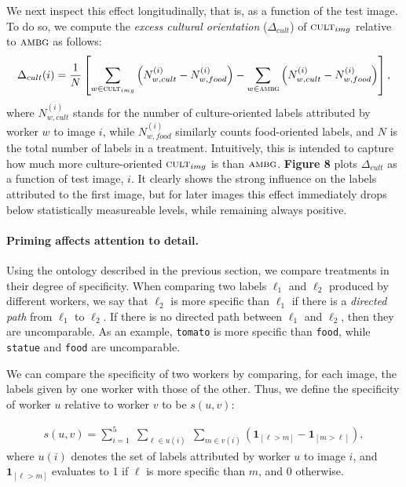 \documentclass[a4paper]{report}
\begin{document}
We next inspect this effect longitudinally, that is, as a function of 
the test image.  To do so, we compute the \textit{excess cultural orientation} 
($\Delta_{cult}$) of
$\textsc{cult}_{img}$ relative to $\textsc{ambg}$ as follows: 
\begin{align}
	\Delta_{cult}(i) = \frac{1}{N}\left[ \sum_{w\in\textsc{cult}_{img}} \left(N_{w,cult}^{(i)} - N_{w,food}^{(i)}\right)
	- \sum_{w\in\textsc{ambg}} \left(N_{w,cult}^{(i)} - N_{w,food}^{(i)}\right)\right],
\end{align}
where $N_{w,cult}^{(i)}$ stands for the number of culture-oriented labels 
attributed by worker $w$ to image $i$, while $N_{w,food}^{(i)}$ similarly 
counts food-oriented labels, and $N$ is the total number of labels in a 
treatment.  
Intuitively, this is intended to capture how much 
more culture-oriented $\textsc{cult}_{img}$ is than $\textsc{ambg}$.  
\textbf{Figure 8} plots $\Delta_{cult}$ as a function of test image, $i$. It
clearly shows the strong influence on the labels attributed to the first image,
but for later images this effect immediately drops below statistically 
measureable levels, while remaining always positive.

\paragraph{Priming affects attention to detail.} Using the ontology described
in the previous section, we compare treatments in their degree of specificity.
When comparing two labels $\ell_1$ and $\ell_2$ produced by different workers,
we say that $\ell_2$ is more specific than $\ell_1$ if there is a 
\textit{directed path} from $\ell_1$ to $\ell_2$.  If there is no directed path
between $\ell_1$ and $\ell_2$, then they are uncomparable.  As an example,
\texttt{tomato} is more specific than \texttt{food}, while \texttt{statue}
and \texttt{food} are uncomparable.

We can compare the specificity of two workers by comparing, for each image,
the labels given by one worker with those of the other.  Thus, we define the
specificity of worker $u$ relative to worker $v$ to be $s(u,v)$:

\begin{align}
	s(u,v) = \sum_{i=1}^5 \;
	\sum_{\ell \in u(i) } \;
	\sum_{m \in v(i)} 
	\left(\mathbf{1}_{[\ell > m]} - \mathbf{1}_{[m>\ell]}\right),
	\label{eq:worker-specificity}
\end{align}
where $u(i)$ denotes the set of labels attributed by worker $u$ to image $i$, 
and $\mathbf{1}_{[\ell > m]}$ evaluates to 1 if $\ell$ is more specific than 
$m$, and 0 otherwise.
\end{document}
